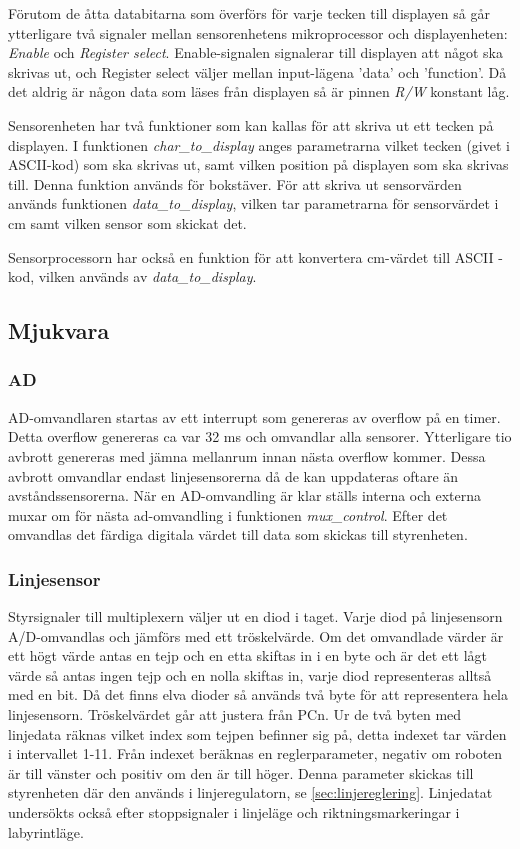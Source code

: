 Förutom de åtta databitarna som överförs för varje tecken till displayen så 
går ytterligare två signaler mellan sensorenhetens mikroprocessor och 
displayenheten: \emph{Enable} och \emph{Register select}. Enable-signalen 
signalerar till displayen att något ska skrivas ut, och Register select 
väljer mellan input-lägena 'data' och 'function'. Då det aldrig är någon data 
som läses från displayen så är pinnen \emph{R/W} konstant låg. 

Sensorenheten har två funktioner som kan kallas för att skriva ut ett tecken 
på displayen. I funktionen \emph{char\_to\_display} anges parametrarna vilket 
tecken (givet i ASCII-kod) som ska skrivas ut, samt vilken position på 
displayen som ska skrivas till. Denna funktion används för bokstäver. För att 
skriva ut sensorvärden används funktionen \emph{data\_to\_display}, vilken 
tar parametrarna för sensorvärdet i cm samt vilken sensor som skickat det. 

Sensorprocessorn har också en funktion för att konvertera cm-värdet till ASCII
-kod, vilken används av \emph{data\_to\_display}.

\subsection{Mjukvara}

\subsubsection{AD}
AD-omvandlaren startas av ett interrupt som genereras av overflow på en timer.
Detta overflow genereras ca var 32 ms och omvandlar alla sensorer. 
Ytterligare tio avbrott genereras med jämna mellanrum innan nästa overflow 
kommer. Dessa avbrott omvandlar endast linjesensorerna då de kan uppdateras
oftare än avståndssensorerna. När en AD-omvandling är klar ställs interna och 
externa muxar om för nästa ad-omvandling i funktionen \emph{mux\_control}. Efter 
det omvandlas det färdiga digitala värdet till data som skickas till
styrenheten.

\subsubsection{Linjesensor}
Styrsignaler till multiplexern väljer ut en diod i taget.
Varje diod på linjesensorn A/D-omvandlas och jämförs med ett tröskelvärde. Om
det omvandlade värder är
ett högt värde antas en tejp och en etta skiftas in i en byte och är det 
ett lågt värde så antas ingen tejp och en nolla skiftas in, varje diod
representeras alltså med en bit. Då det finns elva dioder så används två byte 
för att representera hela linjesensorn. Tröskelvärdet går att justera från PCn. 
Ur de två byten med linjedata räknas vilket index som tejpen befinner sig på,
detta indexet tar värden i intervallet 1-11. Från indexet beräknas en
reglerparameter, negativ om roboten är till vänster och positiv om den är till
höger. Denna parameter skickas till styrenheten där den används i
linjeregulatorn, se \ref{sec:linjereglering}. Linjedatat undersökts också efter
stoppsignaler i linjeläge och riktningsmarkeringar i labyrintläge.


